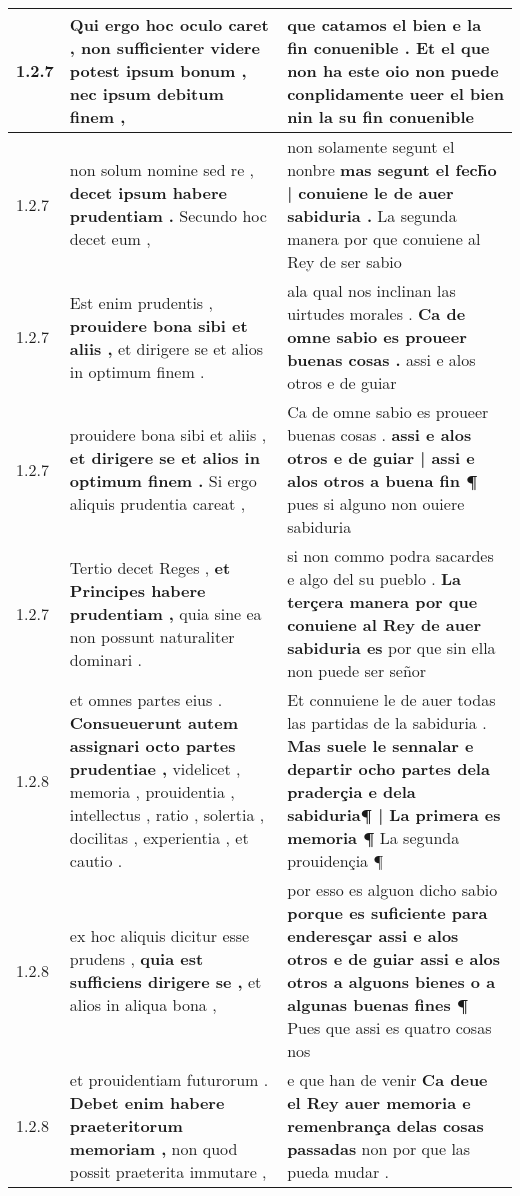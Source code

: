 \begin{tabular}{|p{1cm}|p{6.5cm}|p{6.5cm}|}
1.2.7 & Qui ergo hoc oculo caret , \textbf{ non sufficienter videre potest ipsum bonum , } nec ipsum debitum finem , & que catamos el bien e la fin conuenible . \textbf{ Et el que non ha este oio non puede conplidamente ueer el bien } nin la su fin conuenible \\\hline
1.2.7 & non solum nomine sed re , \textbf{ decet ipsum habere prudentiam . } Secundo hoc decet eum , & non solamente segunt el nonbre \textbf{ mas segunt el fech̃o | conuiene le de auer sabiduria . } La segunda manera por que conuiene al Rey de ser sabio \\\hline
1.2.7 & Est enim prudentis , \textbf{ prouidere bona sibi et aliis , } et dirigere se et alios in optimum finem . & ala qual nos inclinan las uirtudes morales . \textbf{ Ca de omne sabio es proueer buenas cosas . } assi e alos otros e de guiar \\\hline
1.2.7 & prouidere bona sibi et aliis , \textbf{ et dirigere se et alios in optimum finem . } Si ergo aliquis prudentia careat , & Ca de omne sabio es proueer buenas cosas . \textbf{ assi e alos otros e de guiar | assi e alos otros a buena fin ¶ } pues si alguno non ouiere sabiduria \\\hline
1.2.7 & Tertio decet Reges , \textbf{ et Principes habere prudentiam , } quia sine ea non possunt naturaliter dominari . & si non commo podra sacardes e algo del su pueblo . \textbf{ La terçera manera por que conuiene al Rey de auer sabiduria es } por que sin ella non puede ser señor \\\hline
1.2.8 & et omnes partes eius . \textbf{ Consueuerunt autem assignari octo partes prudentiae , } videlicet , memoria , prouidentia , intellectus , ratio , solertia , docilitas , experientia , et cautio . & Et connuiene le de auer todas las partidas de la sabiduria . \textbf{ Mas suele le sennalar e departir ocho partes dela praderçia e dela sabiduria¶ | La primera es memoria ¶ } La segunda prouidençia ¶ \\\hline
1.2.8 & ex hoc aliquis dicitur esse prudens , \textbf{ quia est sufficiens dirigere se , } et alios in aliqua bona , & por esso es alguon dicho sabio \textbf{ porque es suficiente para enderesçar assi e alos otros e de guiar assi e alos otros a alguons bienes o a algunas buenas fines ¶ } Pues que assi es quatro cosas nos \\\hline
1.2.8 & et prouidentiam futurorum . \textbf{ Debet enim habere praeteritorum memoriam , } non quod possit praeterita immutare , & e que han de venir \textbf{ Ca deue el Rey auer memoria e remenbrança delas cosas passadas } non por que las pueda mudar . \\\hline

\end{tabular}
